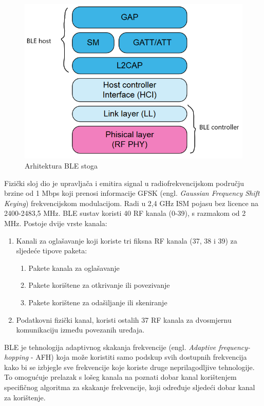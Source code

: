 \begin{figure}[ht]
	\centering
	\includegraphics[scale=0.6]{imgs/ble_stack_arch}
	\caption{Arhitektura BLE stoga \cite{blemanual}}
	\label{fig:ble-stack-arch}
\end{figure}

Fizički sloj dio je upravljača i emitira signal u radiofrekvencijskom području brzine od 1 Mbps koji prenosi informacije GFSK (engl. \textit{Gaussian Frequency Shift Keying}) frekvencijskom modulacijom. Radi u 2,4 GHz ISM pojasu bez licence na 2400-2483,5 MHz. 
BLE sustav koristi 40 RF kanala (0-39), s razmakom od 2 MHz. Postoje dvije vrste kanala:
\begin{enumerate}
	\item Kanali za oglašavanje koji koriste tri fiksna RF kanala (37, 38 i 39) za sljedeće tipove paketa:
	\begin{enumerate}
		\item Pakete kanala za oglašavanje
		\item Pakete korištene za otkrivanje ili povezivanje
		\item Pakete korištene za odašiljanje ili skeniranje
	\end{enumerate}
	\item Podatkovni fizički kanal, koristi ostalih 37 RF kanala za dvosmjernu komunikaciju između povezanih uređaja.
\end{enumerate}

BLE je tehnologija adaptivnog skakanja frekvencije (engl. \textit{Adaptive frequency-hopping} - AFH) koja može koristiti samo podskup svih dostupnih frekvencija kako bi se izbjegle sve frekvencije koje koriste druge neprilagodljive tehnologije. To omogućuje prelazak s lošeg kanala na poznati dobar kanal korištenjem specifičnog algoritma za skakanje frekvencije, koji određuje sljedeći dobar kanal za korištenje.

